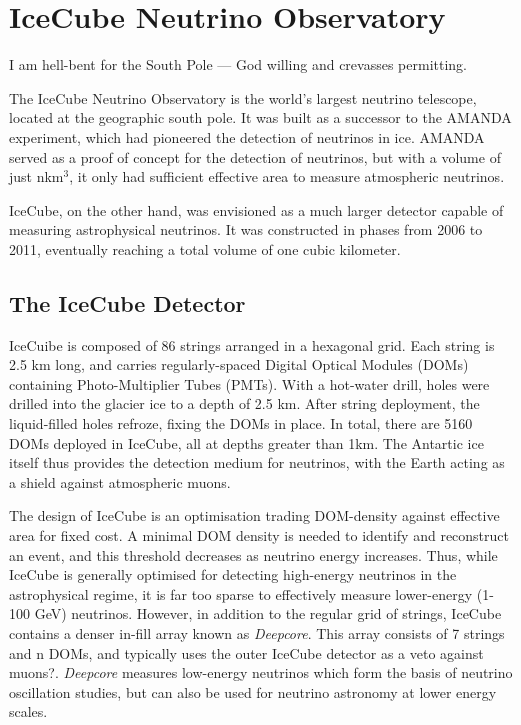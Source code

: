 \setchapterpreamble[u]{\margintoc}
\chapter{IceCube Neutrino Observatory}
\begin{fquote} I am hell-bent for the South Pole — God willing and crevasses permitting.
\end{fquote}
The IceCube Neutrino Observatory is the world's largest neutrino telescope, located at the geographic south pole. It was built as a successor to the AMANDA experiment, which had pioneered the detection of neutrinos in ice. AMANDA served as a proof of concept for the detection of neutrinos, but with a volume of just nkm$^{3}$, it only had sufficient effective area to measure atmospheric neutrinos. 

IceCube, on the other hand, was envisioned as a much larger detector capable of measuring astrophysical neutrinos. It was constructed in phases from 2006 to 2011, eventually reaching a total volume of one cubic kilometer. 

\section{The IceCube Detector}

IceCuibe is composed of 86 strings arranged in a hexagonal grid. Each string is 2.5 km long, and carries regularly-spaced Digital Optical Modules (DOMs) containing Photo-Multiplier Tubes (PMTs). With a hot-water drill, holes were drilled into the glacier ice to a depth of 2.5 km. After string deployment, the liquid-filled holes refroze, fixing the DOMs in place. In total, there are 5160 DOMs deployed in IceCube, all at depths greater than 1km. The Antartic ice itself thus provides the detection medium for neutrinos, with the Earth acting as a shield against atmospheric muons.

The design of IceCube is an optimisation trading DOM-density against effective area for fixed cost. A minimal DOM density is needed to identify and reconstruct an event, and this threshold decreases as neutrino energy increases. Thus, while IceCube is generally optimised for detecting high-energy neutrinos in the astrophysical regime, it is far too sparse to effectively measure lower-energy (1-100 GeV) neutrinos. However, in addition to the regular grid of strings, IceCube contains a denser in-fill array known as \textit{Deepcore}. This array consists of 7 strings and n DOMs, and typically uses the outer IceCube detector as a veto against muons?. \textit{Deepcore} measures low-energy neutrinos which form the basis of neutrino oscillation studies, but can also be used for neutrino astronomy at lower energy scales.

